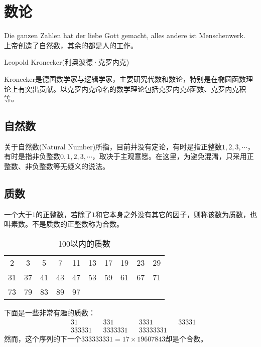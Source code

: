 
\chapter{数论}
\label{chap:number-theory}

\epigraph{Die ganzen Zahlen hat der liebe Gott gemacht, alles andere ist Menschenwerk.\\
  上帝创造了自然数，其余的都是人的工作。}{Leopold Kronecker(利奥波德·克罗内克)}

Kronecker是德国数学家与逻辑学家，主要研究代数和数论，特别是在椭圆函数理论上有突出贡献。以克罗内克命名的数学理论包括克罗内克$\delta$函数、克罗内克积等。

\section{自然数}
\label{sec:what-is-natural-number}

关于自然数(Natural Number)所指，目前并没有定论，有时是指正整数$1,2,3,\cdots$，有时是指非负整数$0,1,2,3,\cdots$，取决于主观意愿。在这里，为避免混淆，只采用正整数、非负整数等无疑义的说法。

\section{质数}
\label{sec:prime-number}

\begin{definition}
  一个大于$1$的正整数，若除了$1$和它本身之外没有其它的因子，则称该数为质数，也叫素数。不是质数的正整数称为合数。
\end{definition}

\begin{table}[htbp]
  \centering
  \caption{100以内的质数}
  \label{tab:prime-numbers<100}
  \begin{tabular}{cccccccccc}
    \hline
    2  & 3  & 5  & 7  & 11 & 13 & 17 & 19 & 23 & 29\\
    31 & 37 & 41 & 43 & 47 & 53 & 59 & 61 & 67 & 71\\
    73 & 79 & 83 & 89 & 97 &    &    &    &    &   \\
    \hline
  \end{tabular}
\end{table}

下面是一些非常有趣的质数：
\begin{align*}
  & 31 && 331 && 3331 && 33331\\
  & 333331 && 3333331 && 33333331
\end{align*}
然而，这个序列的下一个$333333331 = 17 \times 19607843$却是个合数。

